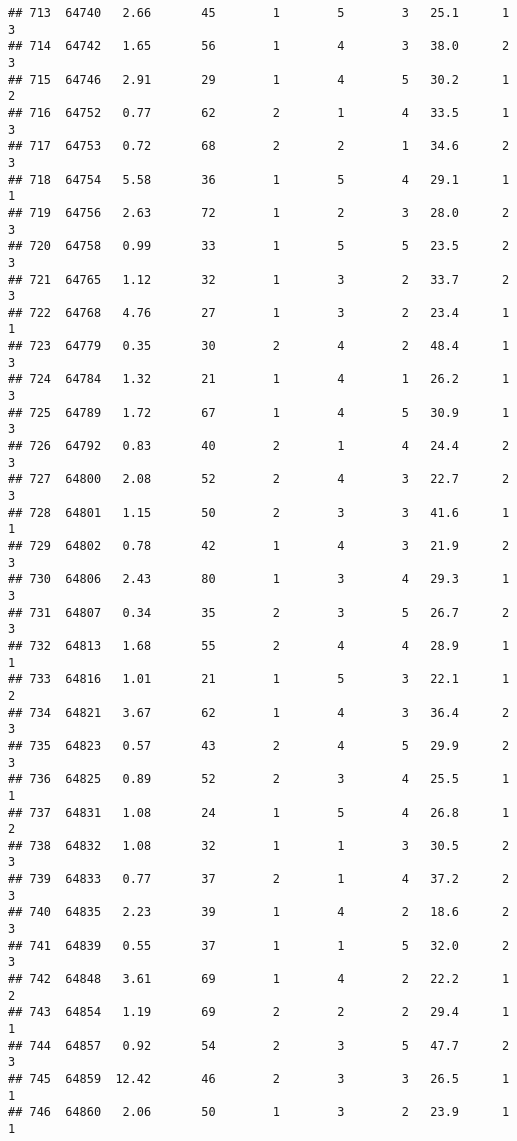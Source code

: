 \documentclass[
]{article}
\begin{document}
\begin{verbatim}
## 713  64740   2.66       45        1        5        3   25.1      1      3
## 714  64742   1.65       56        1        4        3   38.0      2      3
## 715  64746   2.91       29        1        4        5   30.2      1      2
## 716  64752   0.77       62        2        1        4   33.5      1      3
## 717  64753   0.72       68        2        2        1   34.6      2      3
## 718  64754   5.58       36        1        5        4   29.1      1      1
## 719  64756   2.63       72        1        2        3   28.0      2      3
## 720  64758   0.99       33        1        5        5   23.5      2      3
## 721  64765   1.12       32        1        3        2   33.7      2      3
## 722  64768   4.76       27        1        3        2   23.4      1      1
## 723  64779   0.35       30        2        4        2   48.4      1      3
## 724  64784   1.32       21        1        4        1   26.2      1      3
## 725  64789   1.72       67        1        4        5   30.9      1      3
## 726  64792   0.83       40        2        1        4   24.4      2      3
## 727  64800   2.08       52        2        4        3   22.7      2      3
## 728  64801   1.15       50        2        3        3   41.6      1      1
## 729  64802   0.78       42        1        4        3   21.9      2      3
## 730  64806   2.43       80        1        3        4   29.3      1      3
## 731  64807   0.34       35        2        3        5   26.7      2      3
## 732  64813   1.68       55        2        4        4   28.9      1      1
## 733  64816   1.01       21        1        5        3   22.1      1      2
## 734  64821   3.67       62        1        4        3   36.4      2      3
## 735  64823   0.57       43        2        4        5   29.9      2      3
## 736  64825   0.89       52        2        3        4   25.5      1      1
## 737  64831   1.08       24        1        5        4   26.8      1      2
## 738  64832   1.08       32        1        1        3   30.5      2      3
## 739  64833   0.77       37        2        1        4   37.2      2      3
## 740  64835   2.23       39        1        4        2   18.6      2      3
## 741  64839   0.55       37        1        1        5   32.0      2      3
## 742  64848   3.61       69        1        4        2   22.2      1      2
## 743  64854   1.19       69        2        2        2   29.4      1      1
## 744  64857   0.92       54        2        3        5   47.7      2      3
## 745  64859  12.42       46        2        3        3   26.5      1      1
## 746  64860   2.06       50        1        3        2   23.9      1      1

\end{verbatim}
\end{document}
